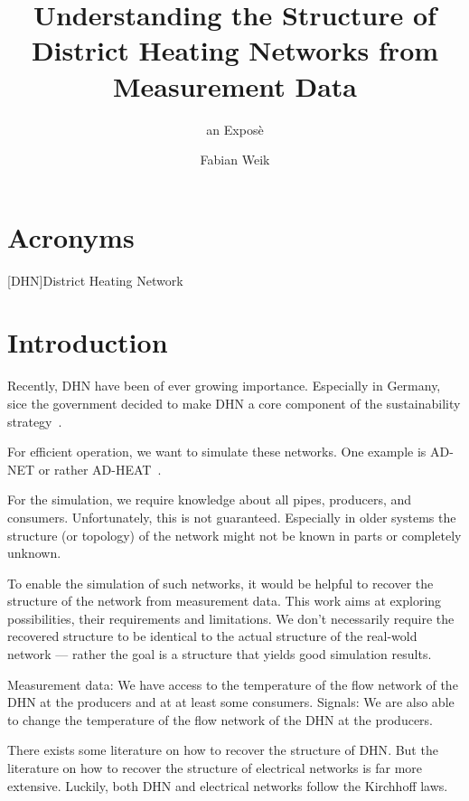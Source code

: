 \documentclass{scrartcl}
\title{Understanding the Structure of District Heating Networks from Measurement Data}
\subtitle{an Exposè}
\author{Fabian Weik}
\begin{document}
    \maketitle

    \section{Acronyms}

    \begin{acronym}
        [DHN]{District Heating Network}
    \end{acronym}

    \section{Introduction}

    Recently, \ac{DHN} have been of ever growing importance.
    Especially in Germany, sice the government decided to make \ac{DHN} a core component of the sustainability strategy~\cite{regierung2024heatingplanning}.

    For efficient operation, we want to simulate these networks.
    One example is AD-NET or rather AD-HEAT~\cite{adnetheat}.

    For the simulation, we require knowledge about all pipes, producers, and consumers.
    Unfortunately, this is not guaranteed.
    Especially in older systems the structure (or topology) of the network might not be known in parts or completely unknown.

    To enable the simulation of such networks, it would be helpful to recover the structure of the network from measurement data.
    This work aims at exploring possibilities, their requirements and limitations.
    We don't necessarily require the recovered structure to be identical to the actual structure of the real-wold network --- rather  the goal is a structure that yields good simulation results.

    Measurement data: We have access to the temperature of the flow network of the \ac{DHN} at the producers and at at least some consumers.
    Signals: We are also able to change the temperature of the flow network of the \ac{DHN} at the producers.

    There exists some literature on how to recover the structure of \ac{DHN}.
    But the literature on how to recover the structure of electrical networks is far more extensive.
    Luckily, both \ac{DHN} and electrical networks follow the Kirchhoff laws.
\end{document}
